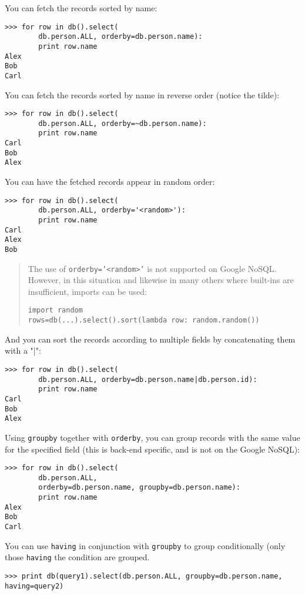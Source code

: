 \documentclass[justified,sixbynine,notoc]{tufte-book}
\def\ft{\small\tt}
\def\inxx#1{\index{#1}}
\begin{document}
\begin{fullwidth}
You can fetch the records sorted by name:

\inxx{orderby} \inxx{groupby} \inxx{having}
\begin{lstlisting}
>>> for row in db().select(
        db.person.ALL, orderby=db.person.name):
        print row.name
Alex
Bob
Carl
\end{lstlisting}

You can fetch the records sorted by name in reverse order (notice the tilde):
\begin{lstlisting}
>>> for row in db().select(
        db.person.ALL, orderby=~db.person.name):
        print row.name
Carl
Bob
Alex
\end{lstlisting}

You can have the fetched records appear in random order:
\begin{lstlisting}
>>> for row in db().select(
        db.person.ALL, orderby='<random>'):
        print row.name
Carl
Alex
Bob
\end{lstlisting}

\begin{quote}The use of {\ft orderby='<random>'} is not supported on Google NoSQL.  However, in this situation and likewise in many others where built-ins are insufficient, imports can be used:
\begin{lstlisting}
import random
rows=db(...).select().sort(lambda row: random.random())
\end{lstlisting}\end{quote}
And you can sort the records according to multiple fields by concatenating them with a "|":
\begin{lstlisting}
>>> for row in db().select(
        db.person.ALL, orderby=db.person.name|db.person.id):
        print row.name
Carl
Bob
Alex
\end{lstlisting}

Using {\ft groupby} together with {\ft orderby}, you can group records with the same value for the specified field (this is back-end specific, and is not on the Google NoSQL):
\begin{lstlisting}
>>> for row in db().select(
        db.person.ALL,
        orderby=db.person.name, groupby=db.person.name):
        print row.name
Alex
Bob
Carl
\end{lstlisting}

You can use {\ft having} in conjunction with {\ft groupby} to group conditionally (only those {\ft having} the condition are grouped.

\begin{lstlisting}
>>> print db(query1).select(db.person.ALL, groupby=db.person.name, having=query2)
\end{lstlisting}


\end{fullwidth}
\end{document}
